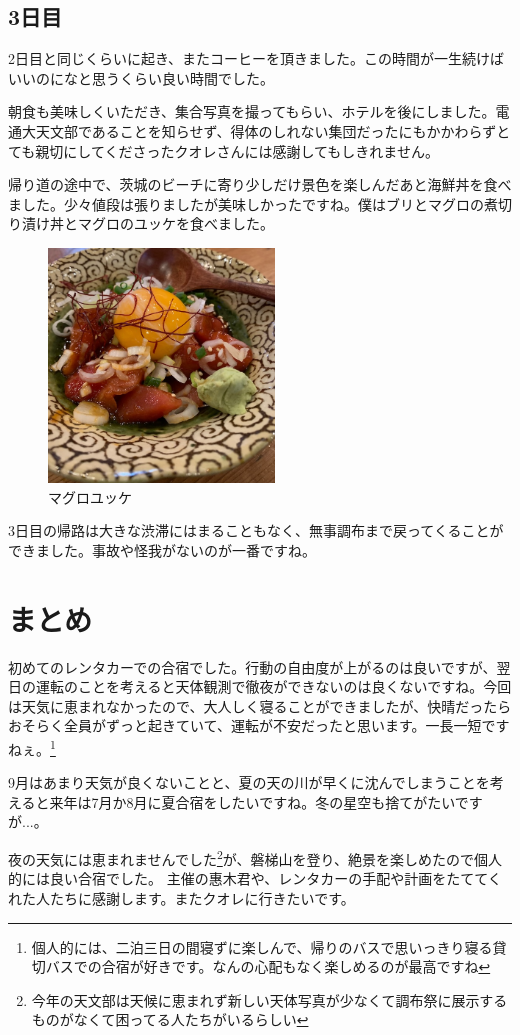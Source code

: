 \documentclass[../main]{subfiles}
\begin{document}
\subsection{3日目}
2日目と同じくらいに起き、またコーヒーを頂きました。この時間が一生続けばいいのになと思うくらい良い時間でした。

朝食も美味しくいただき、集合写真を撮ってもらい、ホテルを後にしました。電通大天文部であることを知らせず、得体のしれない集団だったにもかかわらずとても親切にしてくださったクオレさんには感謝してもしきれません。

帰り道の途中で、茨城のビーチに寄り少しだけ景色を楽しんだあと海鮮丼を食べました。少々値段は張りましたが美味しかったですね。僕はブリとマグロの煮切り漬け丼とマグロのユッケを食べました。
\begin{figure}[H]
\centering
\includegraphics[width=6cm]{sections/Nakahara/yukke.jpeg}
\caption{マグロユッケ}
\centering
\end{figure}
3日目の帰路は大きな渋滞にはまることもなく、無事調布まで戻ってくることができました。事故や怪我がないのが一番ですね。

\section{まとめ}
初めてのレンタカーでの合宿でした。行動の自由度が上がるのは良いですが、翌日の運転のことを考えると天体観測で徹夜ができないのは良くないですね。今回は天気に恵まれなかったので、大人しく寝ることができましたが、快晴だったらおそらく全員がずっと起きていて、運転が不安だったと思います。一長一短ですねぇ。\footnote{個人的には、二泊三日の間寝ずに楽しんで、帰りのバスで思いっきり寝る貸切バスでの合宿が好きです。なんの心配もなく楽しめるのが最高ですね}

9月はあまり天気が良くないことと、夏の天の川が早くに沈んでしまうことを考えると来年は7月か8月に夏合宿をしたいですね。冬の星空も捨てがたいですが...。

夜の天気には恵まれませんでした\footnote{今年の天文部は天候に恵まれず新しい天体写真が少なくて調布祭に展示するものがなくて困ってる人たちがいるらしい}が、磐梯山を登り、絶景を楽しめたので個人的には良い合宿でした。
主催の惠木君や、レンタカーの手配や計画をたててくれた人たちに感謝します。またクオレに行きたいです。
\end{document}
